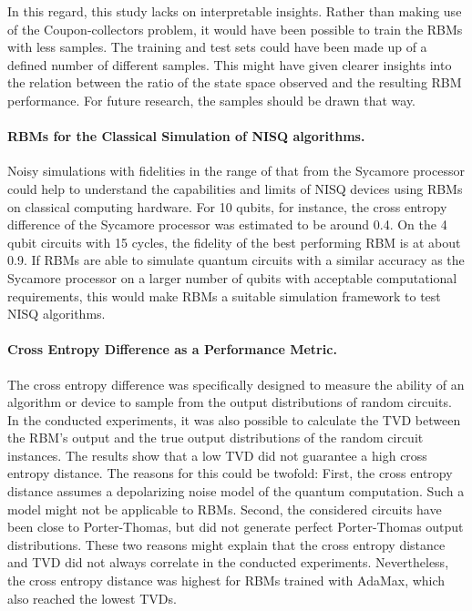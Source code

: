 In this regard, this study lacks on interpretable insights. Rather than making use of the 
Coupon-collectors problem, it would have been possible to train the RBMs with less samples. 
The training and test sets could have been made up of a defined number of different 
samples. This might have given clearer insights into the relation between the ratio of the 
state space observed and the resulting RBM performance. For future research, the samples should
be drawn that way.

\paragraph{RBMs for the Classical Simulation of NISQ algorithms.}
Noisy simulations with 
fidelities in the range of that from the Sycamore processor could help to understand the 
capabilities and limits of NISQ devices using RBMs on classical computing hardware. 
For 10 qubits, for instance, the cross entropy difference
of the Sycamore processor was estimated to be around 0.4. On the 4 qubit circuits with 
15 cycles, the fidelity of the best performing RBM is at about 0.9. 
If RBMs are able to simulate quantum circuits with a similar accuracy as the Sycamore 
processor on a larger number of qubits with acceptable computational requirements, this 
would make RBMs a suitable simulation framework to test NISQ algorithms.

\paragraph{Cross Entropy Difference as a Performance Metric.}
The cross entropy difference was specifically designed to measure the 
ability of an algorithm or device to sample from the output distributions of 
random circuits. In the conducted experiments, it was also possible to 
calculate the TVD between the RBM's output and the true output distributions of 
the random circuit instances. The results show that a low TVD did not guarantee a 
high cross entropy distance. The reasons for this could be twofold: First, the 
cross entropy distance assumes a depolarizing noise model of the quantum computation. 
Such a model might not be applicable to RBMs. Second, the considered circuits have been 
close to Porter-Thomas, but did not generate perfect Porter-Thomas output distributions.
These two reasons might explain that the cross entropy distance and TVD did not 
always correlate in the conducted experiments. Nevertheless, the cross entropy distance 
was highest for RBMs trained with AdaMax, which also reached the lowest TVDs.

